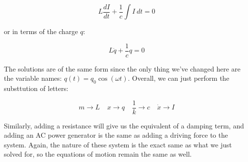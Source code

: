 \[ L \frac{dI}{dt} + \frac 1c \int I \ dt = 0\] 

or in terms of the charge $q$: 

\[ L \ddot q + \frac{1}{c} q = 0\] 

The solutions are of the same form since the only thing we've changed here are the variable names: $q(t) = q_0 \cos(\omega t)$. Overall, we can just perform the substtution of letters: 

\[ m \to L \phantom{aa} x \to q \phantom{aa} \frac 1k \to c \phantom{aa} \dot x \to I\] 

Similarly, adding a resistance will give us the equivalent of a damping term, and adding an AC power generator is the same as adding a driving force to the system. Again, the nature of these system is the exact same as what we just solved for, so the equations of motion remain the same as well.




